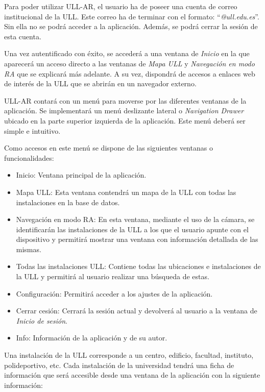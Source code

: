 Para poder utilizar ULL-AR, el usuario ha de poseer una cuenta de correo institucional de la ULL. Este correo ha de terminar con el formato: ``\textit{@ull.edu.es}''. Sin ella no se podrá acceder a la aplicación. Además, se podrá cerrar la sesión de esta cuenta.

Una vez autentificado con éxito, se accederá a una ventana de \textit{Inicio} en la que aparecerá un acceso directo a las ventanas de \textit{Mapa ULL} y \textit{Navegación en modo RA} que se  explicará más adelante. A su vez, dispondrá de accesos a enlaces web de interés de la ULL que se abrirán en un navegador externo. 

ULL-AR contará con un menú para moverse por las diferentes ventanas de la aplicación. Se implementará un menú deslizante lateral o \textit{Navigation Drawer} \cite{URL::NavigationDraw} ubicado en la parte superior izquierda de la aplicación. Este menú deberá ser simple e intuitivo.

Como accesos en este menú se dispone de las siguientes ventanas o funcionalidades:

\begin{itemize}
    \item Inicio: Ventana principal de la aplicación.
    \item Mapa ULL: Esta ventana contendrá un mapa de la ULL con todas las instalaciones en la base de datos. 
    \item Navegación en modo RA: En esta ventana, mediante el uso de la cámara, se identificarán las instalaciones de la ULL a los que el usuario apunte con el dispositivo y permitirá mostrar una ventana con información detallada de las mismas.
    \item Todas las instalaciones ULL: Contiene todas las ubicaciones e instalaciones de la ULL y permitirá al usuario realizar una búsqueda de estas. 
    \item Configuración: Permitirá acceder a los ajustes de la aplicación.
    \item Cerrar cesión: Cerrará la sesión actual y devolverá al usuario a la ventana de \textit{Inicio de sesión}.
    \item Info: Información de la aplicación y de su autor.
\end{itemize}

Una instalación de la ULL corresponde a un centro, edificio, facultad, instituto, polideportivo, etc. Cada instalación de la universidad tendrá una ficha de información que será accesible desde una ventana de la aplicación con la siguiente información:

